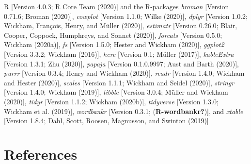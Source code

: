 \documentclass[
  english,
  ,man,floatsintext]{apa6}
\begin{document}
R {[}Version 4.0.3; R Core Team (2020){]} and the R-packages \emph{broman} {[}Version 0.71.6; Broman (2020){]}, \emph{cowplot} {[}Version 1.1.0; Wilke (2020){]}, \emph{dplyr} {[}Version 1.0.2; Wickham, François, Henry, and Müller (2020){]}, \emph{estimatr} {[}Version 0.26.0; Blair, Cooper, Coppock, Humphreys, and Sonnet (2020){]}, \emph{forcats} {[}Version 0.5.0; Wickham (2020a){]}, \emph{fs} {[}Version 1.5.0; Hester and Wickham (2020){]}, \emph{ggplot2} {[}Version 3.3.2; Wickham (2016){]}, \emph{here} {[}Version 0.1; Müller (2017){]}, \emph{kableExtra} {[}Version 1.3.1; Zhu (2020){]}, \emph{papaja} {[}Version 0.1.0.9997; Aust and Barth (2020){]}, \emph{purrr} {[}Version 0.3.4; Henry and Wickham (2020){]}, \emph{readr} {[}Version 1.4.0; Wickham and Hester (2020){]}, \emph{scales} {[}Version 1.1.1; Wickham and Seidel (2020){]}, \emph{stringr} {[}Version 1.4.0; Wickham (2019){]}, \emph{tibble} {[}Version 3.0.4; Müller and Wickham (2020){]}, \emph{tidyr} {[}Version 1.1.2; Wickham (2020b){]}, \emph{tidyverse} {[}Version 1.3.0; Wickham et al. (2019){]}, \emph{wordbankr} {[}Version 0.3.1; (\textbf{R-wordbankr?}){]}, and \emph{xtable} {[}Version 1.8.4; Dahl, Scott, Roosen, Magnusson, and Swinton (2019){]}

\newpage

\hypertarget{references}{%
\section{References}\label{references}}

\begingroup
\setlength{\parindent}{-0.5in}
\setlength{\leftskip}{0.5in}
\end{document}

